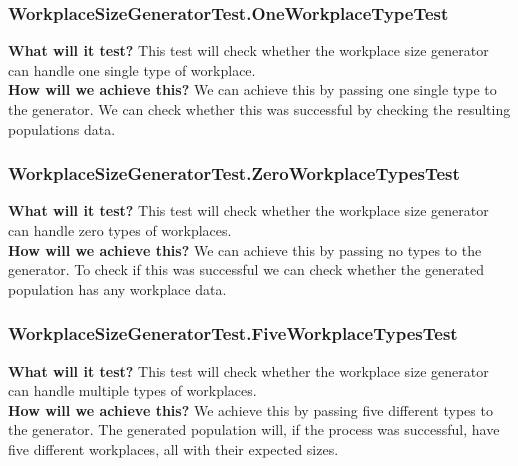 \documentclass{article}
\begin{document}
\subsubsection{WorkplaceSizeGeneratorTest.OneWorkplaceTypeTest}
\textbf{What will it test?}
This test will check whether the workplace size generator can handle one single type of workplace.\\
\newline
\textbf{How will we achieve this?}
We can achieve this by passing one single type to the generator. We can check whether this was successful by checking the resulting populations data.

\subsubsection{WorkplaceSizeGeneratorTest.ZeroWorkplaceTypesTest}
\textbf{What will it test?}
This test will check whether the workplace size generator can handle zero types of workplaces.\\
\newline
\textbf{How will we achieve this?}
We can achieve this by passing no types to the generator. To check if this was successful we can check whether the generated population has any workplace data.

\subsubsection{WorkplaceSizeGeneratorTest.FiveWorkplaceTypesTest}
\textbf{What will it test?}
This test will check whether the workplace size generator can handle multiple types of workplaces.\\
\newline
\textbf{How will we achieve this?}
We achieve this by passing five different types to the generator. The generated population will, if the process was successful, have five different workplaces, all with their expected sizes.
\end{document}

